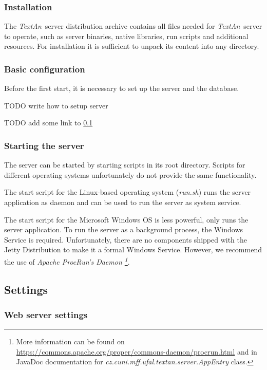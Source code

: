 \documentclass[12pt,a4paper]{report}
\newcommand{\textan}{\emph{TextAn}}
\begin{document}
\subsubsection{Installation}

The \textan\ server distribution archive contains all files needed for \textan\ server to operate,
such as server binaries, native libraries, run scripts and additional resources.
For installation it is sufficient to unpack its content into any directory.

\subsubsection{Basic configuration}

Before the first start, it is necessary to set up the server and the database.

TODO write how to setup server

TODO add some link to \ref{sec:ServerSettings}

\subsubsection{Starting the server}

The server can be started by starting scripts in its root directory. 
Scripts for different operating systems unfortunately do not provide the same functionality.

The start script for the Linux-based operating system (\emph{run.sh}) runs the server application as daemon
and can be used to run the server as system service.

The start script for the Microsoft Windows OS is less powerful, only runs the server application. 
To run the server as a background process, the Windows Service is required. 
Unfortunately, there are no components shipped with the Jetty Distribution to make it a formal Windows Service.
However, we recommend the use of \emph{Apache ProcRun's Daemon
\footnote{More information can be found on \url{https://commons.apache.org/proper/commons-daemon/procrun.html} and in JavaDoc documentation for \emph{cz.cuni.mff.ufal.textan.server.AppEntry} class.}}.

\subsection{Settings}
\label{sec:ServerSettings}

\subsubsection{Web server settings}
\end{document}
